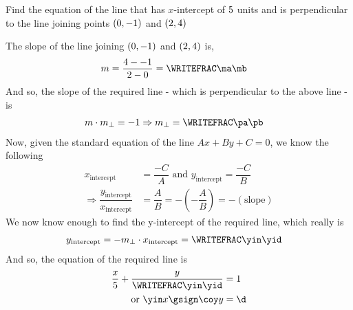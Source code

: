 \question[4] Find the equation of the line that has $x$-intercept of $5$ units and is perpendicular
to the line joining points $(0, -1)$ and $(2, 4)$


\watchout

\ifprintanswers
\fi 

\begin{solution}[\halfpage]
	The slope of the line joining $(0, -1)$ and $(2, 4)$ is,
	\begin{align}
		m &= \dfrac{\vbfour-\vbtwo}{\vbthree-\vbone} = \WRITEFRAC\ma\mb
	\end{align}
	And so, the slope of the required line - which is perpendicular to the above line - is 
	\begin{align}
		m\cdot m_{\perp} &= -1 \Rightarrow m_{\perp} = \WRITEFRAC\pa\pb
	\end{align}
	Now, given the standard equation of the line $Ax + By + C = 0$, we know the following
	\begin{align}
		x_{\text{intercept}} &= \dfrac{-C}{A} \text{ and } y_{\text{intercept}} = \dfrac{-C}{B} \\
		\Rightarrow \dfrac{y_{\text{intercept}}}{x_{\text{intercept}}} &= \dfrac{A}{B} 
    = -\left( -\dfrac{A}{B} \right) = -(\text{slope})
	\end{align}
    We now know enough to find the y-intercept of the required line, which really is
    \begin{align}
    	y_{\text{intercept}} &= -m_{\perp}\cdot x_{\text{intercept}} = \WRITEFRAC\yin\yid
    \end{align}
    And so, the equation of the required line is 
    \begin{align}
    	\dfrac{x}{\vbfive} + \dfrac{y}{\WRITEFRAC\yin\yid} &= 1 \\
      \text{ or } \yin x \gsign\coy y &= \d
    \end{align}
\end{solution}

